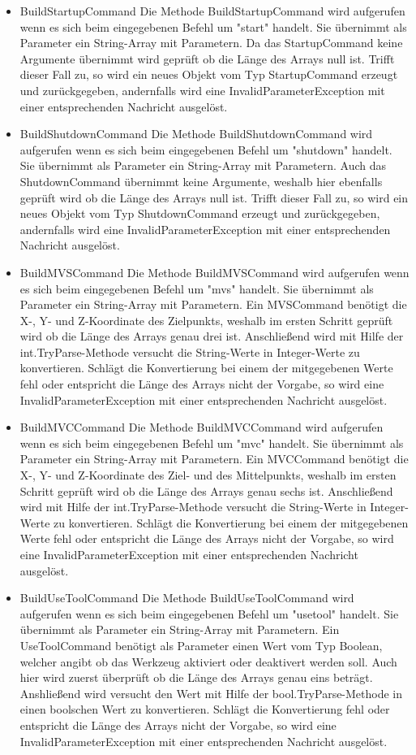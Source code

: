 \begin{itemize}
\begin{itemize}
\item BuildStartupCommand
Die Methode BuildStartupCommand wird aufgerufen wenn es sich beim eingegebenen Befehl um "start" handelt. Sie übernimmt als Parameter ein String-Array mit Parametern. Da das StartupCommand keine Argumente übernimmt wird geprüft ob die Länge des Arrays null ist. Trifft dieser Fall zu, so wird ein neues Objekt vom Typ StartupCommand erzeugt und zurückgegeben, andernfalls wird eine InvalidParameterException mit einer entsprechenden Nachricht ausgelöst.
\item BuildShutdownCommand
Die Methode BuildShutdownCommand wird aufgerufen wenn es sich beim eingegebenen Befehl um "shutdown" handelt. Sie übernimmt als Parameter ein String-Array mit Parametern. Auch das ShutdownCommand übernimmt keine Argumente, weshalb hier ebenfalls geprüft wird ob die Länge des Arrays null ist. Trifft dieser Fall zu, so wird ein neues Objekt vom Typ ShutdownCommand erzeugt und zurückgegeben, andernfalls wird eine InvalidParameterException mit einer entsprechenden Nachricht ausgelöst.
\item BuildMVSCommand
Die Methode BuildMVSCommand wird aufgerufen wenn es sich beim eingegebenen Befehl um "mvs" handelt. Sie übernimmt als Parameter ein String-Array mit Parametern. Ein MVSCommand benötigt die X-, Y- und Z-Koordinate des Zielpunkts, weshalb im ersten Schritt geprüft wird ob die Länge des Arrays genau drei ist. Anschließend wird mit Hilfe der int.TryParse-Methode versucht die String-Werte in Integer-Werte zu konvertieren. Schlägt die Konvertierung bei einem der mitgegebenen Werte fehl oder entspricht die Länge des Arrays nicht der Vorgabe, so wird eine InvalidParameterException mit einer entsprechenden Nachricht ausgelöst.
\item BuildMVCCommand
Die Methode BuildMVCCommand wird aufgerufen wenn es sich beim eingegebenen Befehl um "mvc" handelt. Sie übernimmt als Parameter ein String-Array mit Parametern. Ein MVCCommand benötigt die X-, Y- und Z-Koordinate des Ziel- und des Mittelpunkts, weshalb im ersten Schritt geprüft wird ob die Länge des Arrays genau sechs ist. Anschließend wird mit Hilfe der int.TryParse-Methode versucht die String-Werte in Integer-Werte zu konvertieren. Schlägt die Konvertierung bei einem der mitgegebenen Werte fehl oder entspricht die Länge des Arrays nicht der Vorgabe, so wird eine InvalidParameterException mit einer entsprechenden Nachricht ausgelöst.
\item BuildUseToolCommand
Die Methode BuildUseToolCommand wird aufgerufen wenn es sich beim eingegebenen Befehl um "usetool" handelt. Sie übernimmt als Parameter ein String-Array mit Parametern. Ein UseToolCommand benötigt als Parameter einen Wert vom Typ Boolean, welcher angibt ob das Werkzeug aktiviert oder deaktivert werden soll. Auch hier wird zuerst überprüft ob die Länge des Arrays genau eins beträgt. Anshließend wird versucht den Wert mit Hilfe der bool.TryParse-Methode in einen boolschen Wert zu konvertieren. Schlägt die Konvertierung fehl oder entspricht die Länge des Arrays nicht der Vorgabe, so wird eine InvalidParameterException mit einer entsprechenden Nachricht ausgelöst.
\end{itemize}
\end{itemize}

